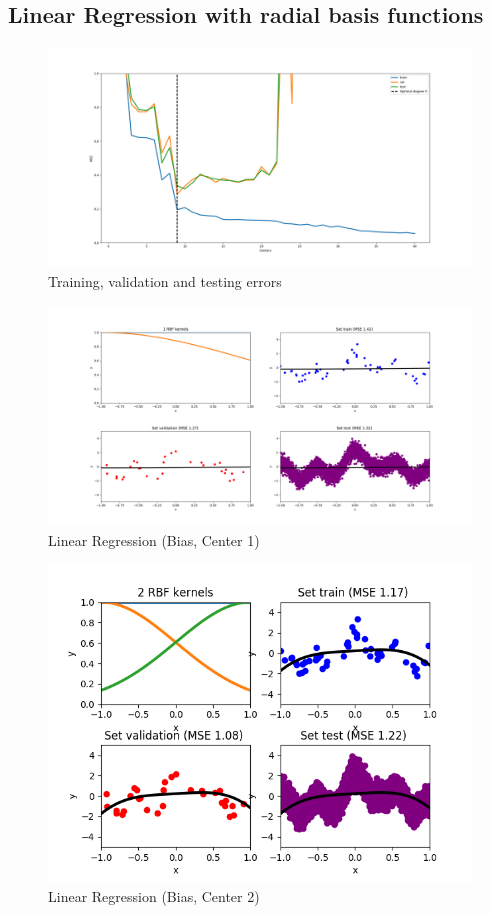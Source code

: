 \documentclass[12pt,halfline,a4paper]{ouparticle}
\begin{document}
\subsection{Linear Regression with radial basis functions}
\begin{figure}[H]
	\centering
	        \includegraphics[width=\textwidth]{figures/linreg_bias_errors.png}
	    \caption{Training, validation and testing errors}
	\end{figure}
	\begin{figure}[H]
	\centering
	        \includegraphics[width=\textwidth]{figures/linreg_bias_c1.png}
	    \caption{Linear Regression (Bias, Center 1)}
	\end{figure}
	\begin{figure}[H]
	\centering
	        \includegraphics[width=\textwidth]{figures/linreg_bias_c2.png}
	    \caption{Linear Regression (Bias, Center 2)}
	\end{figure}
\end{document}
